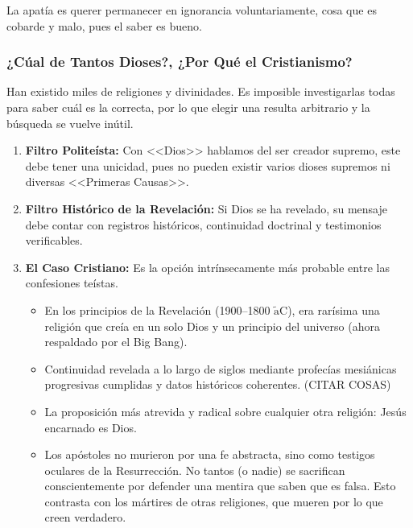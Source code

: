 \documentclass[12pt]{report}
\begin{document}
	La apatía es querer permanecer en ignorancia voluntariamente, cosa que es cobarde y malo, pues el saber es bueno.
	
	
	\subsubsection{¿Cúal de Tantos Dioses?, ¿Por Qué el Cristianismo?}
	
	\begin{minibloque}[Objeción]
		Han existido miles de religiones y divinidades. Es imposible investigarlas todas para saber cuál es la correcta, por lo que elegir una resulta arbitrario y la búsqueda se vuelve inútil.
	\end{minibloque}
	
	\begin{minibloque}[Respuesta]
		\begin{enumerate}
			\item \textbf{Filtro Politeísta:} Con <<Dios>> hablamos del ser creador supremo, este debe tener una unicidad, pues no pueden existir varios dioses supremos ni diversas <<Primeras Causas>>.
			\item \textbf{Filtro Histórico de la Revelación:} Si Dios se ha revelado, su mensaje debe contar con registros históricos, continuidad doctrinal y testimonios verificables.
			\item \textbf{El Caso Cristiano:} Es la opción intrínsecamente más probable entre las confesiones teístas.
			\begin{itemize}
				\item En los principios de la Revelación (1900–1800 $\tilde{\text{a}}$C), era rarísima una religión que creía en un solo Dios y un principio del universo (ahora respaldado por el Big Bang).
				\item Continuidad revelada a lo largo de siglos mediante profecías mesiánicas progresivas cumplidas y datos históricos coherentes. (CITAR COSAS)
				\item La proposición más atrevida y radical sobre cualquier otra religión: Jesús encarnado es Dios.
				\item Los apóstoles no murieron por una fe abstracta, sino como testigos oculares de la Resurrección. No tantos (o nadie) se sacrifican conscientemente por defender una mentira que saben que es falsa. Esto contrasta con los mártires de otras religiones, que mueren por lo que creen verdadero.
			\end{itemize}
		\end{enumerate}
	\end{minibloque}
	
\end{document}
